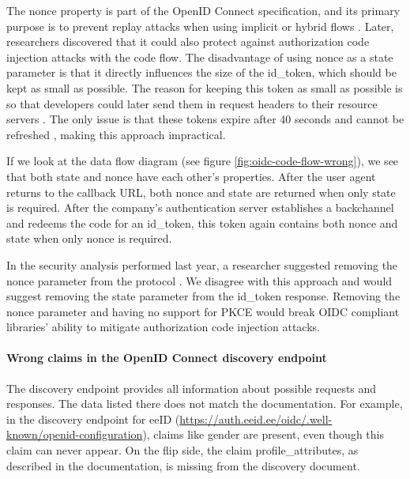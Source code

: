The nonce property is part of the OpenID Connect specification, and its primary purpose is to prevent replay attacks when using implicit or hybrid flows \cite{oidc}. Later, researchers discovered that it could also protect against authorization code injection attacks with the code flow. The disadvantage of using {nonce} as a state parameter is that it directly influences the size of the id\_token, which should be kept as small as possible. The reason for keeping this token as small as possible is so that developers could later send them in request headers to their resource servers \cite{rfc7519}. The only issue is that these tokens expire after 40 seconds and cannot be refreshed \cite{tara-technical}, making this approach impractical.

If we look at the data flow diagram (see figure \ref{fig:oidc-code-flow-wrong}), we see that both state and nonce have each other's properties. After the user agent returns to the callback URL, both {nonce} and {state} are returned when only {state} is required. After the company's authentication server establishes a backchannel and redeems the code for an id\_token, this token again contains both {nonce} and {state} when only {nonce} is required.

In the security analysis performed last year, a researcher suggested removing the nonce parameter from the protocol \cite{tara-security-arnis}. We disagree with this approach and would suggest removing the state parameter from the id\_token response. Removing the nonce parameter and having no support for PKCE would break OIDC compliant libraries' ability to mitigate authorization code injection attacks.

\paragraph{Wrong claims in the OpenID Connect discovery endpoint} The discovery endpoint provides all information about possible requests and responses. The data listed there does not match the documentation. For example, in the discovery endpoint for eeID (\url{https://auth.eeid.ee/oidc/.well-known/openid-configuration}), claims like gender are present, even though this claim can never appear. On the flip side, the claim profile\_attributes, as described in the documentation, is missing from the discovery document. 

